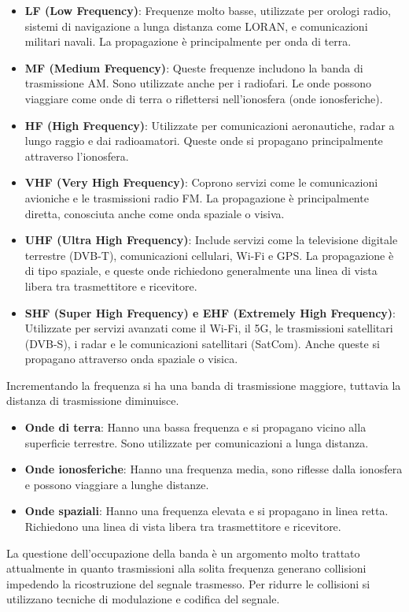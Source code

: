 \begin{itemize}
    \item \textbf{LF (Low Frequency)}: Frequenze molto basse, utilizzate per orologi radio, sistemi di navigazione a lunga distanza come LORAN, e comunicazioni militari navali. La propagazione è principalmente per onda di terra.
    \item \textbf{MF (Medium Frequency)}: Queste frequenze includono la banda di trasmissione AM. Sono utilizzate anche per i radiofari. Le onde possono viaggiare come onde di terra o riflettersi nell'ionosfera (onde ionosferiche).
    \item \textbf{HF (High Frequency)}: Utilizzate per comunicazioni aeronautiche, radar a lungo raggio e dai radioamatori. Queste onde si propagano principalmente attraverso l'ionosfera.
    \item \textbf{VHF (Very High Frequency)}: Coprono servizi come le comunicazioni avioniche e le trasmissioni radio FM. La propagazione è principalmente diretta, conosciuta anche come onda spaziale o visiva.
    \item \textbf{UHF (Ultra High Frequency)}: Include servizi come la televisione digitale terrestre (DVB-T), comunicazioni cellulari, Wi-Fi e GPS. La propagazione è di tipo spaziale, e queste onde richiedono generalmente una linea di vista libera tra trasmettitore e ricevitore.
    \item \textbf{SHF (Super High Frequency) e EHF (Extremely High Frequency)}: Utilizzate per servizi avanzati come il Wi-Fi, il 5G, le trasmissioni satellitari (DVB-S), i radar e le comunicazioni satellitari (SatCom). Anche queste si propagano attraverso onda spaziale o visica.
\end{itemize}

Incrementando la frequenza si ha una banda di trasmissione maggiore, tuttavia la distanza di trasmissione diminuisce.

\begin{itemize}
    \item \textbf{Onde di terra}: Hanno una bassa frequenza e si propagano vicino alla superficie terrestre. Sono utilizzate per comunicazioni a lunga distanza.
    \item \textbf{Onde ionosferiche}: Hanno una frequenza media, sono riflesse dalla ionosfera e possono viaggiare a lunghe distanze.
    \item \textbf{Onde spaziali}: Hanno una frequenza elevata e si propagano in linea retta. Richiedono una linea di vista libera tra trasmettitore e ricevitore.
\end{itemize}

La questione dell'occupazione della banda è un argomento molto trattato attualmente in quanto trasmissioni alla solita frequenza generano collisioni impedendo la ricostruzione del segnale trasmesso. Per ridurre le collisioni si utilizzano tecniche di modulazione e codifica del segnale.


